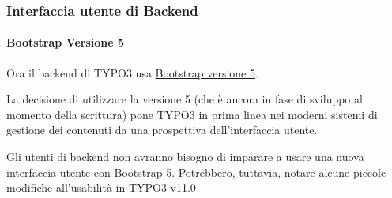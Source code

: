 %

\begin{frame}[fragile]
	\frametitle{Interfaccia utente di Backend}
	\framesubtitle{Bootstrap Versione 5}

	Ora il backend di TYPO3 usa
	\href{https://getbootstrap.com/}{Bootstrap versione 5}.

	\vspace{0.2cm}

    La decisione di utilizzare la versione 5 (che è ancora in fase di sviluppo
    al momento della scrittura) pone TYPO3 in prima linea nei moderni sistemi
    di gestione dei contenuti da una prospettiva dell'interfaccia utente.

	\vspace{0.2cm}

	Gli utenti di backend non avranno bisogno di imparare a usare una nuova
	interfaccia utente con Bootstrap 5. Potrebbero, tuttavia, notare alcune
	piccole modifiche all'usabilità in TYPO3 v11.0

\end{frame}

